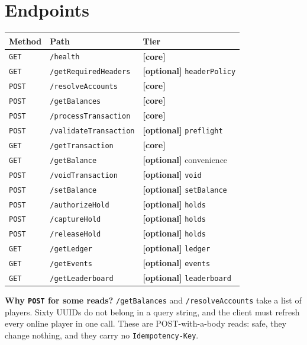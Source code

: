 \documentclass[11pt,a4paper]{article}
\newcommand{\code}[1]{\texttt{\small #1}}
\newcommand{\core}{{\small\color{omceAccentDark}\textbf{[core]}}}
\newcommand{\optional}{{\small\color{omceMuted}\textbf{[optional]}}}
\newcommand{\keybox}[2]{%
  \par\vspace{0.5em}\noindent
  \colorbox{#1}{%
    \begin{minipage}{\dimexpr\linewidth-2\fboxsep\relax}
    \vspace{0.35em}\small #2\vspace{0.35em}
    \end{minipage}}%
  \par\vspace{0.5em}}
\newcommand{\note}[1]{\keybox{omceWash}{#1}}
\begin{document}
\section{Endpoints}

\begin{tabularx}{\linewidth}{L{1.6cm} L{5.6cm} X}
\toprule
\textbf{Method} & \textbf{Path} & \textbf{Tier}\\
\midrule
\code{GET}  & \code{/health}             & \core\\
\code{GET}  & \code{/getRequiredHeaders} & \optional{} \code{headerPolicy}\\
\code{POST} & \code{/resolveAccounts}    & \core\\
\code{POST} & \code{/getBalances}        & \core\\
\code{POST} & \code{/processTransaction} & \core\\
\code{POST} & \code{/validateTransaction}& \optional{} \code{preflight}\\
\code{GET}  & \code{/getTransaction}     & \core\\
\code{GET}  & \code{/getBalance}         & \optional{} convenience\\
\code{POST} & \code{/voidTransaction}    & \optional{} \code{void}\\
\code{POST} & \code{/setBalance}         & \optional{} \code{setBalance}\\
\code{POST} & \code{/authorizeHold}      & \optional{} \code{holds}\\
\code{POST} & \code{/captureHold}        & \optional{} \code{holds}\\
\code{POST} & \code{/releaseHold}        & \optional{} \code{holds}\\
\code{GET}  & \code{/getLedger}          & \optional{} \code{ledger}\\
\code{GET}  & \code{/getEvents}          & \optional{} \code{events}\\
\code{GET}  & \code{/getLeaderboard}     & \optional{} \code{leaderboard}\\
\bottomrule
\end{tabularx}

\note{\textbf{Why \code{POST} for some reads?} \code{/getBalances} and \code{/resolveAccounts} take
a list of players. Sixty UUIDs do not belong in a query string, and the client must refresh every
online player in one call. These are POST-with-a-body reads: safe, they change nothing, and they
carry no \code{Idempotency-Key}.}
\end{document}

